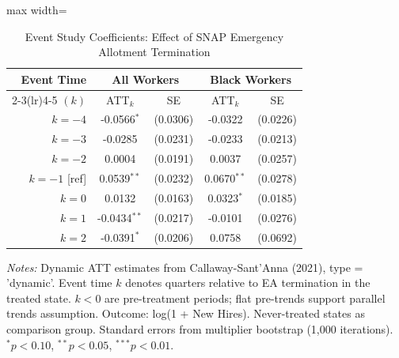 \begin{table}[htbp]
\centering
\caption{Event Study Coefficients: Effect of SNAP Emergency Allotment Termination}
\label{tab:eventstudy}
\begin{adjustbox}{max width=\textwidth}
\begin{threeparttable}
\begin{tabular}{rcccc}
\hline\hline
Event Time & \multicolumn{2}{c}{All Workers} & \multicolumn{2}{c}{Black Workers} \\
\cmidrule(lr){2-3}\cmidrule(lr){4-5}
$(k)$ & ATT$_k$ & SE & ATT$_k$ & SE \\
\hline
$k=-4$ & -0.0566$^{*}$ & (0.0306) & -0.0322 & (0.0226) \\
$k=-3$ & -0.0285 & (0.0231) & -0.0233 & (0.0213) \\
$k=-2$ & 0.0004 & (0.0191) & 0.0037 & (0.0257) \\
$k=-1$ [ref] & 0.0539$^{**}$ & (0.0232) & 0.0670$^{**}$ & (0.0278) \\
$k=0$ & 0.0132 & (0.0163) & 0.0323$^{*}$ & (0.0185) \\
$k=1$ & -0.0434$^{**}$ & (0.0217) & -0.0101 & (0.0276) \\
$k=2$ & -0.0391$^{*}$ & (0.0206) & 0.0758 & (0.0692) \\
\hline\hline
\end{tabular}
\begin{tablenotes}[flushleft]
\footnotesize
\textit{Notes:} Dynamic ATT estimates from Callaway-Sant'Anna (2021), type = 'dynamic'. Event time $k$ denotes quarters relative to EA termination in the treated state. $k < 0$ are pre-treatment periods; flat pre-trends support parallel trends assumption. Outcome: log(1 + New Hires). Never-treated states as comparison group. Standard errors from multiplier bootstrap (1,000 iterations). $^{*}p<0.10$, $^{**}p<0.05$, $^{***}p<0.01$.
\end{tablenotes}
\end{threeparttable}
\end{adjustbox}
\end{table}
